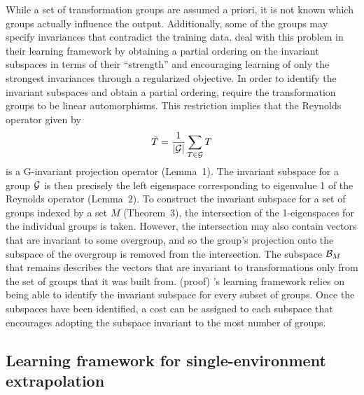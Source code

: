 While a set of transformation groups are assumed a priori, it is not known which groups actually influence the output. Additionally, some of the groups may specify invariances that contradict the training data. \citeauthor{Mouli:2021} deal with this problem in their learning framework by obtaining a partial ordering on the invariant subspaces in terms of their ``strength'' and encouraging learning of only the strongest invariances through a regularized objective. In order to identify the invariant subspaces and obtain a partial ordering, \citeauthor{Mouli:2021} require the transformation groups to be linear automorphisms. This restriction implies that the Reynolds operator given by
\[
\bar{T} = \frac{1}{|\mathcal{G}|}\sum_{T\in\mathcal{G}}T
\]
is a G-invariant projection operator (Lemma~1). The invariant subspace for a group $\mathcal{G}$ is then precisely the left eigenspace corresponding to eigenvalue 1 of the Reynolds operator (Lemma~2). To construct the invariant subspace for a set of groups indexed by a set $M$ (Theorem~3), the intersection of the 1-eigenspaces for the individual groups is taken. However, the intersection may also contain vectors that are invariant to some overgroup, and so the group's projection onto the subspace of the overgroup is removed from the intersection. The subspace $\mathcal{B}_M$ that remains describes the vectors that are invariant to transformations only from the set of groups that it was built from. (\todo proof) \citeauthor{Mouli:2021}'s learning framework relies on being able to identify the invariant subspace for every subset of groups. Once the subspaces have been identified, a cost can be assigned to each subspace that encourages adopting the subspace invariant to the most number of groups.


\subsection{Learning framework for single-environment extrapolation}

